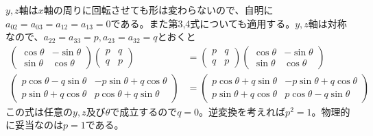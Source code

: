     $y, z$軸は$x$軸の周りに回転させても形は変わらないので、自明に$a_{02} = a_{03} = a_{12} = a_{13} = 0$である。また第3,4式についても適用する。$y, z$軸は対称なので、$a_{22} = a_{33} = p, a_{23} = a_{32} = q$とおくと
    \begin{align*}
        \begin{pmatrix}
            \cos\theta & -\sin\theta\\
            \sin\theta & \cos\theta
        \end{pmatrix}
        \begin{pmatrix}
            p & q\\
            q & p
        \end{pmatrix}
        &=
        \begin{pmatrix}
            p & q\\
            q & p
        \end{pmatrix}
        \begin{pmatrix}
            \cos\theta & -\sin\theta\\
            \sin\theta & \cos\theta
        \end{pmatrix}\\
        \begin{pmatrix}
            p\cos\theta - q\sin\theta & -p\sin\theta + q\cos\theta\\
            p\sin\theta + q\cos\theta & p\cos\theta + q\sin\theta
        \end{pmatrix}
        &=
        \begin{pmatrix}
            p\cos\theta + q\sin\theta & -p\sin\theta + q\cos\theta\\
            p\sin\theta + q\cos\theta & p\cos\theta - q\sin\theta
        \end{pmatrix}
    \end{align*}
    この式は任意の$y, z$及び$\theta$で成立するので$q = 0$。逆変換を考えれば$p^2 = 1$。物理的に妥当なのは$p = 1$である。
    
